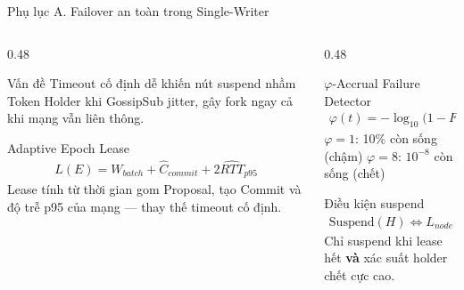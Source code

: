 \documentclass[t, aspectratio=169]{beamer}
\begin{document}
\begin{frame}[c]{Phụ lục A. Failover an toàn trong Single-Writer}
	\begin{columns}[c]
		\begin{column}{0.48\textwidth}
			\begin{alertblock}{Vấn đề}
				\small
				Timeout cố định dễ khiến nút suspend nhầm Token Holder khi GossipSub jitter, gây fork ngay cả khi mạng vẫn liên thông.
			\end{alertblock}
			\vspace{0.2em}
			\begin{block}{Adaptive Epoch Lease}
				\small
				\begin{gather*}
				L(E) = W_{batch} + \widehat{C}_{commit} + 2\widehat{RTT}_{p95}
				\end{gather*}
				\footnotesize
				Lease tính từ thời gian gom Proposal, tạo Commit và độ trễ p95 của mạng --- thay thế timeout cố định.
			\end{block}
		\end{column}
		\begin{column}{0.48\textwidth}
			\begin{block}{$\varphi$-Accrual Failure Detector}
				\small
				\begin{gather*}
				\varphi(t) = -\log_{10}\bigl(1 - F_{HB}(t - t_{last})\bigr)
				\end{gather*}
				\footnotesize
				$\varphi = 1$: 10\% còn sống (chậm) \newline
				$\varphi = 8$: $10^{-8}$ còn sống (chết)
			\end{block}
			\vspace{0.2em}
			\begin{alertblock}{Điều kiện suspend}
				\small
				\begin{gather*}
				\text{Suspend}(H) \iff L_{node}(E) \text{ hết} \;\wedge\; \varphi > 8
				\end{gather*}
				\footnotesize
				Chỉ suspend khi lease hết \textbf{và} xác suất holder chết cực cao.
			\end{alertblock}
		\end{column}
	\end{columns}
\end{frame}
\end{document}
